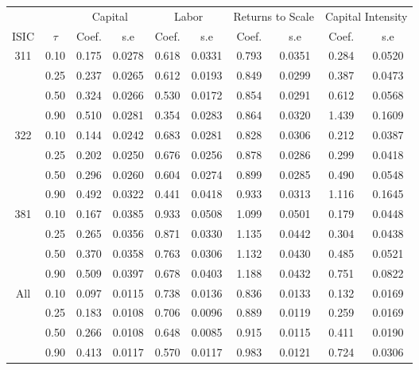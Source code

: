 \begin{table}[H]
\centering
\begin{tabular}{cccccccccc}
  \hline\hline & & \multicolumn{2}{c}{Capital}  & \multicolumn{2}{c}{Labor} & \multicolumn{2}{c}{Returns to Scale} & \multicolumn{2}{c}{Capital Intensity}\\ \cmidrule(lr){3-4} \cmidrule(lr){5-6} \cmidrule(lr){7-8} \cmidrule(lr){9-10}ISIC & $\tau$ & Coef. & s.e & Coef. & s.e & Coef. & s.e & Coef. & s.e \\ 
  \hline
311 & 0.10 & 0.175 & 0.0278 & 0.618 & 0.0331 & 0.793 & 0.0351 & 0.284 & 0.0520 \\ 
   & 0.25 & 0.237 & 0.0265 & 0.612 & 0.0193 & 0.849 & 0.0299 & 0.387 & 0.0473 \\ 
   & 0.50 & 0.324 & 0.0266 & 0.530 & 0.0172 & 0.854 & 0.0291 & 0.612 & 0.0568 \\ 
   & 0.90 & 0.510 & 0.0281 & 0.354 & 0.0283 & 0.864 & 0.0320 & 1.439 & 0.1609 \\ 
  322 & 0.10 & 0.144 & 0.0242 & 0.683 & 0.0281 & 0.828 & 0.0306 & 0.212 & 0.0387 \\ 
   & 0.25 & 0.202 & 0.0250 & 0.676 & 0.0256 & 0.878 & 0.0286 & 0.299 & 0.0418 \\ 
   & 0.50 & 0.296 & 0.0260 & 0.604 & 0.0274 & 0.899 & 0.0285 & 0.490 & 0.0548 \\ 
   & 0.90 & 0.492 & 0.0322 & 0.441 & 0.0418 & 0.933 & 0.0313 & 1.116 & 0.1645 \\ 
  381 & 0.10 & 0.167 & 0.0385 & 0.933 & 0.0508 & 1.099 & 0.0501 & 0.179 & 0.0448 \\ 
   & 0.25 & 0.265 & 0.0356 & 0.871 & 0.0330 & 1.135 & 0.0442 & 0.304 & 0.0438 \\ 
   & 0.50 & 0.370 & 0.0358 & 0.763 & 0.0306 & 1.132 & 0.0430 & 0.485 & 0.0521 \\ 
   & 0.90 & 0.509 & 0.0397 & 0.678 & 0.0403 & 1.188 & 0.0432 & 0.751 & 0.0822 \\ 
  All & 0.10 & 0.097 & 0.0115 & 0.738 & 0.0136 & 0.836 & 0.0133 & 0.132 & 0.0169 \\ 
   & 0.25 & 0.183 & 0.0108 & 0.706 & 0.0096 & 0.889 & 0.0119 & 0.259 & 0.0169 \\ 
   & 0.50 & 0.266 & 0.0108 & 0.648 & 0.0085 & 0.915 & 0.0115 & 0.411 & 0.0190 \\ 
   & 0.90 & 0.413 & 0.0117 & 0.570 & 0.0117 & 0.983 & 0.0121 & 0.724 & 0.0306 \\ 
   \hline
\end{tabular}
\end{table}
